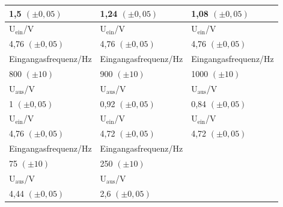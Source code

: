 \documentclass[12pt]{scrartcl}
\begin{document}
\begin{table}[htbp]
\begin{center}
\begin{tabular}{|l|l|l|}
1,5 $(\pm 0,05)$ & 1,24 $(\pm 0,05)$ & 1,08 $(\pm 0,05)$ \\ \hline
U$_\text{ein}$/V & U$_\text{ein}$/V & U$_\text{ein}$/V \\ \hline
4,76 $(\pm 0,05)$ & 4,76 $(\pm 0,05)$ & 4,76 $(\pm 0,05)$ \\ \hline \hline
Eingangasfrequenz/Hz & Eingangasfrequenz/Hz & Eingangasfrequenz/Hz \\ \hline
800 $(\pm 10)$ & 900 $(\pm 10)$ & 1000 $(\pm 10)$ \\ \hline
U$_\text{aus}$/V & U$_\text{aus}$/V & U$_\text{aus}$/V \\ \hline
1 $(\pm 0,05)$ & 0,92 $(\pm 0,05)$ & 0,84 $(\pm 0,05)$ \\ \hline
U$_\text{ein}$/V & U$_\text{ein}$/V & U$_\text{ein}$/V \\ \hline
4,76 $(\pm 0,05)$ & 4,72 $(\pm 0,05)$ & 4,72 $(\pm 0,05)$ \\ \hline \hline
Eingangasfrequenz/Hz & Eingangasfrequenz/Hz &  \\ \hline
75 $(\pm 10)$ & 250 $(\pm 10)$ &  \\ \hline
U$_\text{aus}$/V & U$_\text{aus}$/V &  \\ \hline
4,44 $(\pm 0,05)$ & 2,6 $(\pm 0,05)$ &  \\ \hline
\end{tabular}
\end{center}
\label{tab:2.3}
\end{table}
\end{document}
